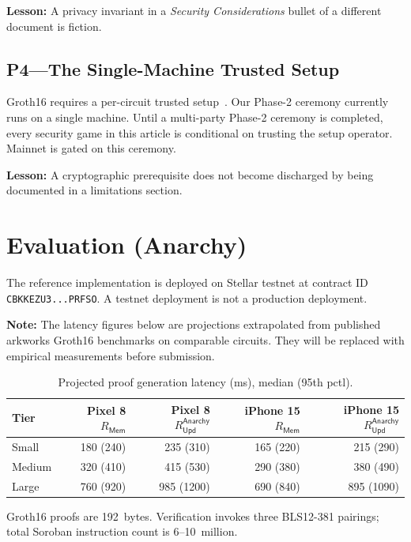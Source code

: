 \documentclass[journal]{IEEEtran}
\newcommand{\Rmem}{R_{\mathsf{Mem}}}
\newcommand{\Rupd}{R_{\mathsf{Upd}}^{\mathsf{Anarchy}}}
\begin{document}
\textbf{Lesson:} A privacy invariant in a \emph{Security Considerations} bullet of a different document is fiction.

\subsection{P4---The Single-Machine Trusted Setup}

Groth16 requires a per-circuit trusted setup~\cite{groth2016}. Our Phase-2 ceremony currently runs on a single machine. Until a multi-party Phase-2 ceremony is completed, every security game in this article is conditional on trusting the setup operator. Mainnet is gated on this ceremony.

\textbf{Lesson:} A cryptographic prerequisite does not become discharged by being documented in a limitations section.

\section{Evaluation (Anarchy)}

The reference implementation is deployed on Stellar testnet at contract ID \texttt{CBKKEZU3...PRFSO}. A testnet deployment is not a production deployment.

\textbf{Note:} The latency figures below are projections extrapolated from published arkworks Groth16 benchmarks on comparable circuits. They will be replaced with empirical measurements before submission.

\begin{table}[t]
\centering
\caption{Projected proof generation latency (ms), median (95th pctl).}
\label{tab:latency}
\begin{tabular}{@{}lrrrr@{}}
\toprule
Tier & Pixel 8 $\Rmem$ & Pixel 8 $\Rupd$ & iPhone 15 $\Rmem$ & iPhone 15 $\Rupd$ \\
\midrule
Small & 180 (240) & 235 (310) & 165 (220) & 215 (290) \\
Medium & 320 (410) & 415 (530) & 290 (380) & 380 (490) \\
Large & 760 (920) & 985 (1200) & 690 (840) & 895 (1090) \\
\bottomrule
\end{tabular}
\end{table}

Groth16 proofs are 192~bytes. Verification invokes three BLS12-381 pairings; total Soroban instruction count is 6--10~million.
\end{document}
